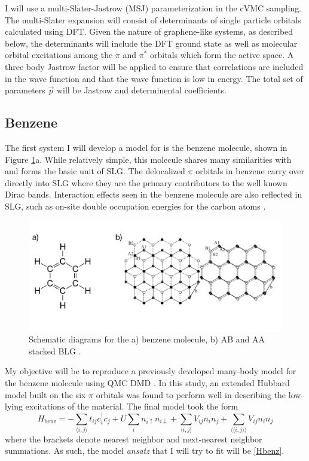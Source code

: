 \documentclass[12pt]{article}
\begin{document}
I will use a multi-Slater-Jastrow (MSJ) parameterization in the cVMC sampling.
The multi-Slater expansion will consist of determinants of single particle orbitals calculated using DFT.
Given the nature of graphene-like systems, as described below, the determinants will include the DFT ground state as well as molecular orbital excitations among the $\pi$ and $\pi^*$ orbitals which form the active space.
A three body Jastrow factor will be applied to ensure that correlations are included in the wave function and that the wave function is low in energy.
The total set of parameters $\vec{p}$ will be Jastrow and determinental coefficients.

\subsection{Benzene}
The first system I will develop a model for is the benzene molecule, shown in Figure \ref{fig:proposed}a.
While relatively simple, this molecule shares many similarities with and forms the basic unit of SLG.
The delocalized $\pi$ orbitals in benzene carry over directly into SLG where they are the primary contributors to the well known Dirac bands.
Interaction effects seen in the benzene molecule are also reflected in SLG, such as on-site double occupation energies for the carbon atoms \cite{Zheng2017, Wagner2015}.

\begin{figure}
\centering
\includegraphics[width=1.0\linewidth]{./figs/proposed.pdf}
\caption{Schematic diagrams for the a) benzene molecule, b) AB and AA stacked BLG \cite{doi:10.1063/1.5007713}.}
\label{fig:proposed}
\end{figure}

My objective will be to reproduce a previously developed many-body model for the benzene molecule using QMC DMD \cite{Wagner2015}.
In this study, an extended Hubbard model built on the six $\pi$ orbitals was found to perform well in describing the low-lying excitations of the material.
The final model took the form 
\begin{equation}
H_\text{benz} = -\sum_{\langle i,j \rangle} t_{ij}c_i^\dagger c_j + U \sum_i n_{i\uparrow}n_{i\downarrow}  + \sum_{\langle i,j \rangle}V_{ij} n_i n_j + \sum_{\langle \langle i,j \rangle\rangle}V_{ij} n_i n_j
\label{Hbenz}
\end{equation}
where the brackets denote nearest neighbor and next-nearest neighbor summations.
As such, the model \textit{ansatz} that I will try to fit will be \eqref{Hbenz}.
\end{document}
